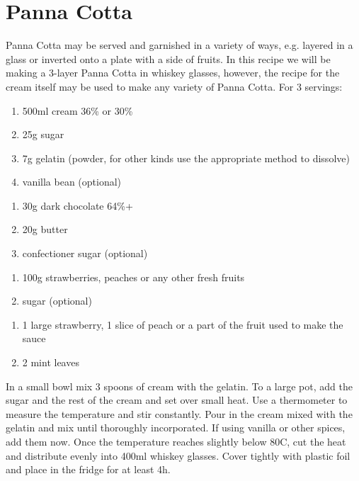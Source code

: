 \section{Panna Cotta}
Panna Cotta may be served and garnished in a variety of ways, e.g. layered in a
glass or inverted onto a plate with a side of fruits. In this recipe we will be
making a 3-layer Panna Cotta in whiskey glasses, however, the recipe for the
cream itself may be used to make any variety of Panna Cotta.
For 3 servings:

\begin{enumerate}
  \item 500ml cream 36\% or 30\%
  \item 25g sugar
  \item 7g gelatin (powder, for other kinds use the appropriate method to
  dissolve)
  \item vanilla bean (optional)
\end{enumerate}

\begin{enumerate}
  \item 30g dark chocolate 64\%+
  \item 20g butter
  \item confectioner sugar (optional)
\end{enumerate}

\begin{enumerate}
  \item 100g strawberries, peaches or any other fresh fruits
  \item sugar (optional)
\end{enumerate}

\begin{enumerate}
  \item 1 large strawberry, 1 slice of peach or a part of the fruit used to
  make the sauce
  \item 2 mint leaves
\end{enumerate}

In a small bowl mix 3 spoons of cream with the gelatin. To a large pot, add the
sugar and the rest of the cream and set over small heat. Use a thermometer to
measure the temperature and stir constantly. Pour in the cream mixed with the
gelatin and mix until thoroughly incorporated. If using vanilla or other
spices, add them now. Once the temperature reaches slightly below 80C, cut the
heat and distribute evenly into 400ml whiskey glasses. Cover tightly with
plastic foil and place in the fridge for at least 4h.

